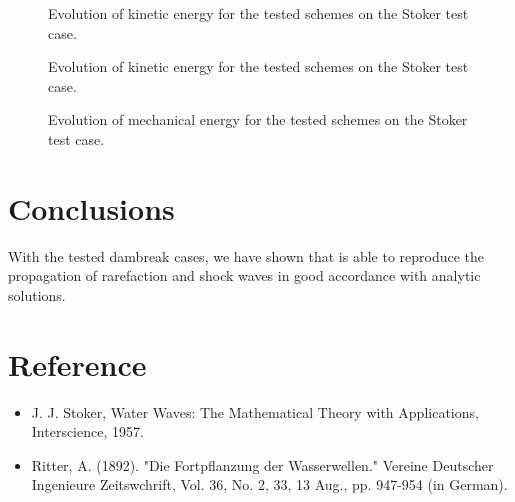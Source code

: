 \begin{figure}[H]
\centering
  \caption{Evolution of kinetic energy for the tested schemes on the Stoker test case.}
\label{fig:stoker:Ep}
\end{figure}

\begin{figure}[H]
\centering
  \caption{Evolution of kinetic energy for the tested schemes on the Stoker test case.}
\label{fig:stoker:Ec}
\end{figure}

\begin{figure}[H]
\centering
  \caption{Evolution of mechanical energy for the tested schemes on the Stoker test case.}
\label{fig:stoker:Em}
\end{figure}

\section{ Conclusions}

With the tested dambreak cases, we have shown that  is able to reproduce the propagation
of rarefaction and shock waves in good accordance with analytic solutions.

\section{Reference}

\begin{itemize}
\item J. J. Stoker, Water Waves: The Mathematical Theory with Applications, Interscience, 1957.
\item Ritter, A. (1892). "Die Fortpflanzung der Wasserwellen." Vereine Deutscher Ingenieure Zeitswchrift, Vol. 36, No. 2, 33,
13 Aug., pp. 947-954 (in German).
\end{itemize}
